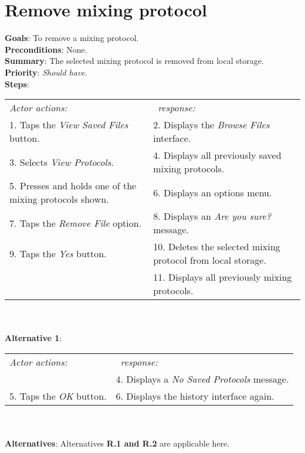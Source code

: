\section{Remove mixing protocol}
 \label{removedist}
  \textbf{Goals}: To remove a mixing protocol.\\
  \textbf{Preconditions}: None.\\
  \textbf{Summary}: The selected mixing protocol is removed from local storage.\\
  \textbf{Priority}: \emph{Should have}.\\
  \textbf{Steps}: \\
    \begin{tabular}{ p{} p{} }
  	\emph{Actor actions:} & \emph{\projectname\ response:} \\
    1. Taps the \emph{View Saved Files} button. & 2. Displays the \emph{Browse Files} interface.\\
    3. Selects \emph{View Protocols}. & 4. Displays all previously saved mixing protocols.\\
    5. Presses and holds one of the mixing protocols shown. & 6. Displays an options menu. \\
    7. Taps the \emph{Remove File} option. & 8. Displays an \emph{Are you sure?} message.\\
    9. Taps the \emph{Yes} button. & 10. Deletes the selected mixing protocol from local storage. \\
     & 11. Displays all previously mixing protocols.\\
    \end{tabular}
                \\
     \\\textbf{Alternative 1}: \\
    \begin{tabular}{ p{} p{} }
  	\emph{Actor actions:} & \emph{\projectname\ response:} \\
            & 4. Displays a \emph{No Saved Protocols} message. \\
    5. Taps the \emph{OK} button. & 6. Displays the history interface again. \\
    \end{tabular}
    \\
    \\\textbf{Alternatives}: Alternatives \textbf{R.1 and R.2} are applicable here.
